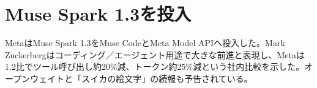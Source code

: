 \section{Muse Spark 1.3を投入}
MetaはMuse Spark 1.3をMuse CodeとMeta Model APIへ投入した。Mark Zuckerbergはコーディング／エージェント用途で大きな前進と表現し、Metaは1.2比でツール呼び出し約20\%減、トークン約25\%減という社内比較を示した。オープンウェイトと「スイカの絵文字」の続報も予告されている。
